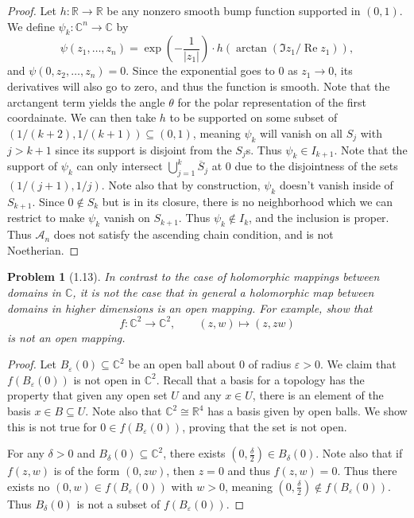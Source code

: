 \documentclass[11pt, letterpaper]{article}
\theoremstyle{plain}
\newtheorem{problem}{Problem}
\begin{document}
\begin{proof}
	Let $h : \mathbb{R}  \to \mathbb{R} $ be any nonzero smooth bump function supported in $(0,1)$. We define $\psi _k : \mathbb{C} ^n \to \mathbb{C} $ by
	\[
		\psi (z_1, \ldots ,z_n) = \exp \left( -\frac{1}{\left| z_1 \right| }  \right) \cdot h(\arctan (\Im z_1 / \operatorname{Re} z_1))
	,\]
	and $\psi (0,z_2, \ldots ,z_n)=0$. Since the exponential goes to 0 as $z_1 \to 0$, its derivatives will also go to zero, and thus the function is smooth. Note that the arctangent term yields the angle $\theta $ for the polar representation of the first coordainate. We can then take $h$ to be supported on some subset of$(1/(k+2),1/(k+1))\subseteq (0,1)$, meaning $\psi _k$ will vanish on all $S_{j} $ with $j>k+1$ since its support is disjoint from the $S_j$s. Thus $\psi _k\in I_{k+1} $. Note that the support of $\psi _k$ can only intersect $\bigcup_{j=1}^k \overline{S} _j$ at 0 due to the disjointness of the sets $(1/(j+1),1/j)$. Note also that by construction, $\psi _k$ doesn't vanish inside of $S_{k+1} $. Since $0\notin S_k$ but is in its closure, there is no neighborhood which we can restrict to make $\psi _k$ vanish on $S_{k+1} $. Thus $\psi _k \notin I_k$, and the inclusion is proper. Thus $\mathcal{A} _n$ does not satisfy the ascending chain condition, and is not Noetherian.
\end{proof}


\begin{problem}[1.13]
	In contrast to the case of holomorphic mappings between domains in $\mathbb{C} $, it is not the case that in general a holomorphic map between domains in higher dimensions is an open mapping. For example, show that
	\[
		f : \mathbb{C} ^2 \to \mathbb{C} ^2,\qquad (z,w)\mapsto (z,zw)
	\]
	is not an open mapping.
\end{problem}
\begin{proof}
	Let $B_\varepsilon (0)\subseteq \mathbb{C} ^2$ be an open ball about 0 of radius $\varepsilon >0$. We claim that $f(B_\varepsilon (0))$ is not open in $\mathbb{C} ^2$. Recall that a basis for a topology has the property that given any open set $U$ and any $x\in U$, there is an element of the basis $x\in B \subseteq U$. Note also that $\mathbb{C} ^2 \cong \mathbb{R} ^4$ has a basis given by open balls. We show this is not true for $0\in f(B_\varepsilon (0))$, proving that the set is not open.

	For any $\delta >0$ and $B_\delta (0)\subseteq \mathbb{C} ^2$, there exists $(0,\frac{\delta }{2} )\in B_\delta (0)$. Note also that if $f(z,w)$ is of the form $(0,zw)$, then $z=0$ and thus $f(z,w)=0$. Thus there exists no $(0,w)\in f(B_\varepsilon (0))$ with $w>0$, meaning $(0,\frac{\delta }{2} )\notin f(B_\varepsilon (0))$. Thus $B_\delta (0)$ is not a subset of $f(B_\varepsilon (0))$.
\end{proof}
\end{document}
